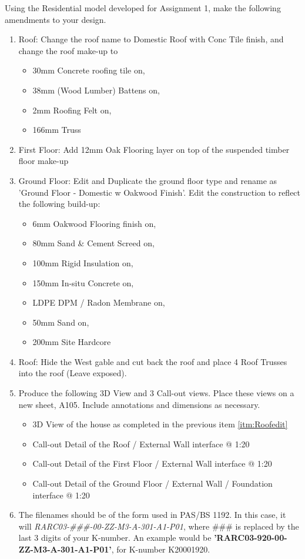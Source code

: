 Using the Residential model developed for Assignment 1, make the following amendments to your design.
\begin{enumerate}
	\item\label{itm:roof} Roof: Change the roof name to Domestic Roof with Conc Tile finish, and change the roof make-up to 
	\begin{itemize}
		\item 30mm Concrete roofing tile on,
		\item 38mm (Wood Lumber) Battens on,
		\item 2mm Roofing Felt on,
		\item 166mm Truss
	\end{itemize}
	\item\label{itm:FirstFloor} First Floor: Add 12mm Oak Flooring layer on top of the suspended timber floor make-up
	\item\label{itm:GroundFloor} Ground Floor: Edit and Duplicate the ground floor type and rename as 'Ground Floor - Domestic w Oakwood Finish'.  Edit the construction to reflect the following build-up:
	\begin{itemize}
		\item 6mm Oakwood Flooring finish on,
		\item 80mm Sand \& Cement Screed on,
		\item 100mm Rigid Insulation on,
		\item 150mm In-situ Concrete on,
		\item LDPE DPM / Radon Membrane on,
		\item 50mm Sand on,
		\item 200mm Site Hardcore
	\end{itemize}
	\item\label{itm:Roofedit} Roof: Hide the West gable and cut back the roof and place 4 Roof Trusses into the roof (Leave exposed).
	\item Produce the following 3D View and 3 Call-out views. Place these views on a new sheet, A105.  Include annotations and dimensions as necessary.
	\begin{itemize}
		\item 3D View of the house as completed in the previous item \ref{itm:Roofedit} 
		\item Call-out Detail of the Roof / External Wall interface @ 1:20
		\item Call-out Detail of the First Floor / External Wall interface @ 1:20
		\item Call-out Detail of the Ground Floor / External Wall / Foundation interface @ 1:20
	\end{itemize}
	\item The filenames should be of the form used in PAS/BS 1192.  In this case, it will \textit{RARC03-\#\#\#-00-ZZ-M3-A-301-A1-P01}, where \#\#\# is replaced by the last 3 digits of your K-number. An example would be \textbf{'RARC03-920-00-ZZ-M3-A-301-A1-P01'}, for K-number K20001920.
\end{enumerate}
